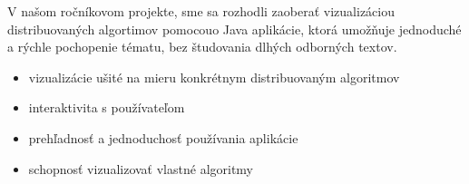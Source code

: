 
V našom ročníkovom projekte, sme sa rozhodli zaoberať vizualizáciou distribuovaných algortimov
pomocouo Java aplikácie, ktorá umožňuje jednoduché a rýchle pochopenie tématu, bez
študovania dlhých odborných textov.

\begin{itemize}

    \item vizualizácie ušité na mieru konkrétnym distribuovaným algoritmov
    \item interaktivita s používateľom
    \item prehľadnosť a jednoduchosť používania aplikácie
    \item schopnosť vizualizovať vlastné algoritmy

\end{itemize}

